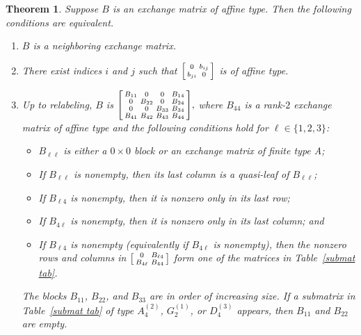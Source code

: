 \documentclass{amsart}
\newtheorem{theorem}[proposition]{Theorem}
\theoremstyle{definition}
\theoremstyle{remark}
\numberwithin{equation}{section}
\newcommand{\set}[1]{{\lbrace #1 \rbrace}}
\newcommand{\0}{{\mathbf{0}}}
\renewcommand{\b}{\mathbf{b}}
\begin{document}
\begin{theorem}\label{neigh B}
Suppose $B$ is an exchange matrix of affine type.
Then the following conditions are equivalent.
\begin{enumerate}[label=\rm(\roman*), ref=(\roman*)]
\item \label{neigh}
$B$ is a neighboring exchange matrix.
\item \label{aff 2}
There exist indices $i$ and $j$ such that $\begin{bsmallmatrix}0&b_{ij}\\b_{ji}&0\end{bsmallmatrix}$ is of affine type.
\item \label{neigh detailed}
Up to relabeling, $B$ is
    $
      \begin{bsmallmatrix}
        B_{11} 	& 0 		& 0 		& B_{14} \\ 
        0 		& B_{22} 	& 0 		& B_{24} \\
        0 		& 0 		& B_{33} 	& B_{34} \\
        B_{41} 	& B_{42} 	& B_{43} 	& B_{44}
      \end{bsmallmatrix},
    $ 
where $B_{44}$ is a rank-$2$ exchange matrix of affine type and the following conditions hold for ${\ell\in\set{1,2,3}}$:
\begin{itemize}
\item
$B_{\ell\ell}$ is either a $0\times0$ block or an exchange matrix of finite type A; %
\item
If $B_{\ell\ell}$ is nonempty, then its last column is a quasi-leaf of $B_{\ell\ell}$;
\item
If $B_{\ell4}$ is nonempty, then it is nonzero only in its last row;
\item
If $B_{4\ell}$ is nonempty, then it is nonzero only in its last column; and
\item
If $B_{\ell4}$ is nonempty (equivalently if $B_{4\ell}$ is nonempty), then the nonzero rows and columns in $\begin{bsmallmatrix} 0 & B_{\ell4} \\ B_{4\ell} & B_{44} \end{bsmallmatrix}$ form one of the matrices in Table~\ref{submat tab}.
\end{itemize}
The blocks $B_{11}$, $B_{22}$, and $B_{33}$ are in order of increasing size. 
If a submatrix in Table~\ref{submat tab} of type $A_{4}^{(2)}$, $G_{2}^{(1)}$, or $D_{4}^{(3)}$ appears, then $B_{11}$ and $B_{22}$ are empty.
\end{enumerate}
\end{theorem}
\end{document}
